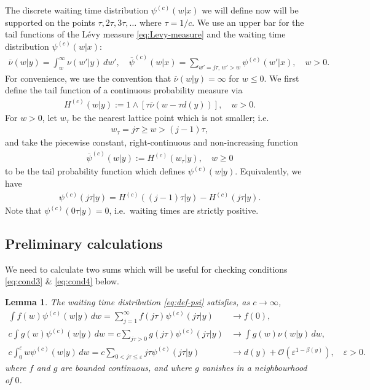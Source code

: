 \documentclass[a4paper,12pt]{elsarticle}
\numberwithin{equation}{section}
\theoremstyle{plain}
\newtheorem{lemma}[theorem]{Lemma}
\theoremstyle{definition}
\theoremstyle{remark}
\numberwithin{equation}{section}
\newcommand{\1}{\mathbf 1}
\begin{document}
The discrete waiting time distribution $\psi^{(c)}(w|x)$ we will define now will be supported on the points $\tau, 2\tau, 3\tau, \ldots$ where $\tau = 1/c$.
We use an upper bar for the tail functions of the L\'evy measure
\eqref{eq:Levy-measure} and the waiting time distribution $\psi^{(c)}(w|x)$:
\begin{align}
  \overline \nu(w|y) = \int_w^\infty \nu(w'|y)\,dw',
  \quad
  \overline \psi^{(c)}(w|x) = \sum_{w' = j\tau,\, w' > w} \psi^{(c)}(w'|x),
  \quad w > 0.
\end{align}
For convenience, we use the convention that $\overline \nu(w|y) = \infty$ for $w \le 0$.  We first define the tail function of a continuous probability measure via
\begin{align}
  H^{(c)}(w | y) := 1 \wedge \left[\tau \overline \nu\left(w - \tau d(y)\right)\right], \quad w > 0.
\end{align}
For $w>0$, let $w_\tau$ be the nearest lattice point which is not smaller; i.e.\
\begin{align} \label{eq:w-tau}
w_\tau = j\tau \ge w > (j-1)\tau,
\end{align}
and take the piecewise constant,
right-continuous and non-increasing function
\begin{align}
  \overline\psi^{(c)}(w|y) := H^{(c)}(w_\tau|y), \quad w \ge 0
\end{align}
to be the tail probability function which defines $\psi^{(c)}(w|y)$.
Equivalently, we have
\begin{align} \label{eq:def-psi}
  \psi^{(c)}(j\tau | y) = H^{(c)}((j-1)\tau | y) - H^{(c)}(j\tau | y).
\end{align}
Note that $\psi^{(c)}(0\tau | y) = 0$, i.e.\ waiting times are strictly positive.


\subsection{Preliminary calculations}

We need to calculate two sums which will be useful for checking conditions
\eqref{eq:cond3} \& \eqref{eq:cond4} below.

\begin{lemma}
The waiting time distribution \eqref{eq:def-psi} satisfies, as $c \to \infty$,
\begin{align}
\label{eq:psi2delta}
\int f(w) \psi^{(c)}(w|y)\,dw = \sum_{j = 1}^\infty f(j\tau) \psi^{(c)}(j\tau|y)
&\to f(0),
\\ \label{eq:psi-non-local}
c \int g(w) \psi^{(c)}(w|y)\,dw
= c \sum\limits_{j\tau > 0} g(j\tau) \psi^{(c)}(j\tau|y)
&\to \int g(w) \nu(w|y)\,dw,
\\ \label{eq:psi-local}
c \int_0^\varepsilon w \psi^{(c)}(w|y)\,dw
= c \sum\limits_{0 < j\tau \le \varepsilon} j\tau \psi^{(c)}(j\tau | y)
&\to d(y)
+ \mathcal O(\varepsilon^{1-\beta(y)}), \quad \varepsilon > 0.
\end{align}
where $f$ and $g$ are bounded continuous, and where $g$ vanishes in a neighbourhood of $0$.
\end{lemma}
\end{document}
